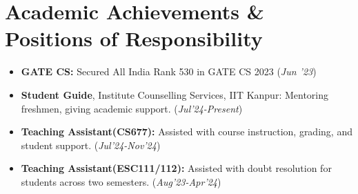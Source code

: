 \documentclass[10.8pt, a4paper]{extarticle}
\newcommand{\shorterSection}[1]{\vspace{-10pt}\section{#1}}
\begin{document}
\shorterSection{Academic Achievements \& Positions of Responsibility}
\begin{itemize}
\item \textbf{GATE CS:} Secured All India Rank 530 in GATE CS 2023 \hfill\hfill(\textit{Jun '23}) \vspace{0.2mm}

\item \textbf{Student Guide}, Institute Counselling Services, IIT Kanpur: Mentoring freshmen, giving academic support. \hfill(\textit{Jul'24-Present}) \vspace{0.2mm}

\item \textbf{Teaching Assistant(CS677):} Assisted with course instruction, grading, and student support.  \hfill(\textit{Jul'24-Nov'24}) \vspace{0.2mm}

\item \textbf{Teaching Assistant(ESC111/112):} Assisted with doubt resolution for students across two semesters. \hfill(\textit{Aug'23-Apr'24}) \vspace{0.2mm}

\vspace{2mm}
\end{itemize}
\vspace{-2mm}
\end{document}
